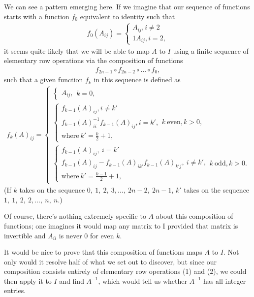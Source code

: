\documentclass[12pt]{article}
\begin{document}
\begin{enumerate}
    We can see a pattern emerging here. If we imagine that our
    sequence of functions starts with a function $f_0$ equivalent
    to identity such that
    \begin{align*}
      f_0(A_{ij}) =
      \begin{cases}
        A_{ij}, i \neq 2\\
        1A_{ij}, i = 2,
      \end{cases}
    \end{align*}
    it seems quite likely that we will be able to map $A$ to $I$
    using a finite sequence of elementary row operations via the
    composition of functions
    \begin{align*}
      f_{2n-1} \circ f_{2n-2} \circ \ldots \circ f_{0},
    \end{align*}
    such that a given function $f_{k}$ in this sequence is
    defined as
    \begin{align*}
      f_{k}(A)_{ij} =
      \begin{cases}
        \begin{cases}
          A_{ij},
        \end{cases} k = 0,\\
        \begin{cases}
          f_{k-1}(A)_{ij}, i \neq k'\\
          f_{k-1}(A)_{ii}^{-1}f_{k-1}(A)_{ij}, i = k',\\
          \text{where}\ k' = \frac{k}{2} + 1,
        \end{cases} k\ \text{even}, k > 0,\\
        \begin{cases}
          f_{k-1}(A)_{ij},\ i = k'\\
          f_{k-1}(A)_{ij} - f_{k-1}(A)_{ik'}f_{k-1}(A)_{k'j},\ i \neq k',\\
          \text{where}\ k' = \frac{k - 1}{2} + 1,
        \end{cases} k\ \text{odd}, k > 0.
      \end{cases}
    \end{align*}
    (If $k$ takes on the sequence $0,\ 1,\ 2,\ 3,\ldots,\ 2n-2,\
    2n-1$, $k'$ takes on the sequence $1,\ 1,\ 2,\ 2,\ldots,\ n,\
    n$.)

    Of course, there's nothing extremely specific to $A$ about
    this composition of functions; one imagines it would map any
    matrix to I provided that matrix is invertible and $A_{ii}$
    is never $0$ for even $k$.

    It would be nice to prove that this composition of functions
    maps $A$ to $I$. Not only would it resolve half of what we
    set out to discover, but since our composition consists
    entirely of elementary row operations (1) and (2), we could
    then apply it to $I$ and find $A^{-1}$, which would tell us
    whether $A^{-1}$ has all-integer entries.


\end{enumerate}
\end{document}
